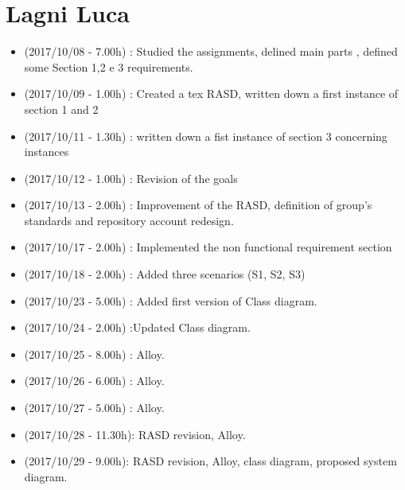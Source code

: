 \documentclass[a4paper,leqno]{book}
\begin{document}
\section{Lagni Luca}
\begin{itemize}
\item (2017/10/08 - 7.00h) : Studied the assignments, delined main parts , defined some Section 1,2 e 3 requirements.
\item (2017/10/09 - 1.00h) : Created a tex RASD, written down a first instance of section 1 and 2
\item (2017/10/11 - 1.30h) : written down a fist instance of section 3 concerning instances
\item (2017/10/12 - 1.00h) : Revision of the goals 
\item (2017/10/13 - 2.00h) : Improvement of the RASD, definition of group's standards and repository account redesign.
\item (2017/10/17 - 2.00h) : Implemented the non functional requirement section
\item (2017/10/18 - 2.00h) : Added three scenarios (S1, S2, S3)
\item (2017/10/23 - 5.00h) : Added first version of Class diagram.
\item (2017/10/24 - 2.00h) :Updated Class diagram.
\item (2017/10/25 - 8.00h) : Alloy.
\item (2017/10/26 - 6.00h) : Alloy.
\item (2017/10/27 - 5.00h) : Alloy.
\item (2017/10/28 - 11.30h): RASD revision, Alloy.
\item (2017/10/29 - 9.00h): RASD revision, Alloy, class diagram, proposed system diagram.
\end{itemize}
\end{document}
